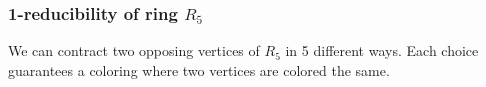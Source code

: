\begin{frame}
    \frametitle{1-reducibility of ring $R_5$}
    
    We can contract two opposing vertices of $R_5$ in 5 different ways. Each choice guarantees a coloring where two vertices are colored the same.


\end{frame}

